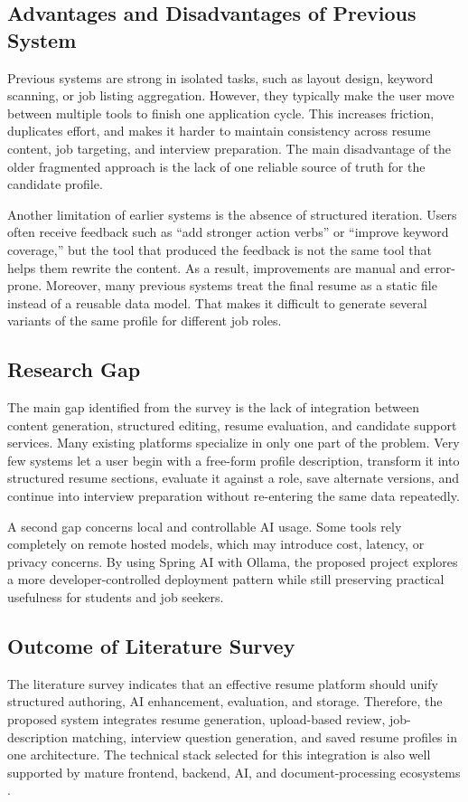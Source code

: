 \subsection{Advantages and Disadvantages of Previous System}
\noindent Previous systems are strong in isolated tasks, such as layout design, keyword scanning, or job listing aggregation. However, they typically make the user move between multiple tools to finish one application cycle. This increases friction, duplicates effort, and makes it harder to maintain consistency across resume content, job targeting, and interview preparation. The main disadvantage of the older fragmented approach is the lack of one reliable source of truth for the candidate profile.

\noindent Another limitation of earlier systems is the absence of structured iteration. Users often receive feedback such as ``add stronger action verbs'' or ``improve keyword coverage,'' but the tool that produced the feedback is not the same tool that helps them rewrite the content. As a result, improvements are manual and error-prone. Moreover, many previous systems treat the final resume as a static file instead of a reusable data model. That makes it difficult to generate several variants of the same profile for different job roles.

\subsection{Research Gap}
\noindent The main gap identified from the survey is the lack of integration between content generation, structured editing, resume evaluation, and candidate support services. Many existing platforms specialize in only one part of the problem. Very few systems let a user begin with a free-form profile description, transform it into structured resume sections, evaluate it against a role, save alternate versions, and continue into interview preparation without re-entering the same data repeatedly.

\noindent A second gap concerns local and controllable AI usage. Some tools rely completely on remote hosted models, which may introduce cost, latency, or privacy concerns. By using Spring AI with Ollama, the proposed project explores a more developer-controlled deployment pattern while still preserving practical usefulness for students and job seekers.

\subsection{Outcome of Literature Survey}
\noindent The literature survey indicates that an effective resume platform should unify structured authoring, AI enhancement, evaluation, and storage. Therefore, the proposed system integrates resume generation, upload-based review, job-description matching, interview question generation, and saved resume profiles in one architecture. The technical stack selected for this integration is also well supported by mature frontend, backend, AI, and document-processing ecosystems \cite{spring_ai_docs,pdfbox_docs,poi_docs}.

